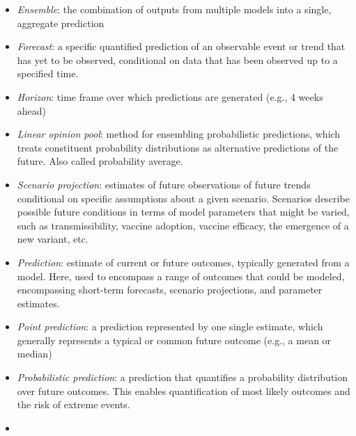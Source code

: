 \documentclass[
]{article}
\begin{document}
\begin{tcolorbox}[enhanced jigsaw, title=\textcolor{quarto-callout-tip-color}{\faLightbulb}\hspace{0.5em}{Keywords and definitions: Concepts in statistical forecasting}, coltitle=black, leftrule=.75mm, colframe=quarto-callout-tip-color-frame, left=2mm, colback=white, bottomrule=.15mm, colbacktitle=quarto-callout-tip-color!10!white, toptitle=1mm, breakable, opacityback=0, rightrule=.15mm, arc=.35mm, toprule=.15mm, bottomtitle=1mm, titlerule=0mm, opacitybacktitle=0.6]

\begin{itemize}
\item
  \emph{Ensemble}: the combination of outputs from multiple models into
  a single, aggregate prediction
\item
  \emph{Forecast}: a specific quantified prediction of an observable
  event or trend that has yet to be observed, conditional on data that
  has been observed up to a specified time.
\item
  \emph{Horizon}: time frame over which predictions are generated (e.g.,
  4 weeks ahead)
\item
  \emph{Linear opinion pool}: method for ensembling probabilistic
  predictions, which treats constituent probability distributions as
  alternative predictions of the future. Also called probability
  average.
\item
  \emph{Scenario projection}: estimates of future observations of future
  trends conditional on specific assumptions about a given scenario.
  Scenarios describe possible future conditions in terms of model
  parameters that might be varied, such as transmissibility, vaccine
  adoption, vaccine efficacy, the emergence of a new variant, etc.
\item
  \emph{Prediction}: estimate of current or future outcomes, typically
  generated from a model. Here, used to encompass a range of outcomes
  that could be modeled, encompassing short-term forecasts, scenario
  projections, and parameter estimates.
\item
  \emph{Point prediction}: a prediction represented by one single
  estimate, which generally represents a typical or common future
  outcome (e.g., a mean or median)
\item
  \emph{Probabilistic prediction}: a prediction that quantifies a
  probability distribution over future outcomes. This enables
  quantification of most likely outcomes and the risk of extreme events.
\item

\end{itemize}
\end{tcolorbox}
\end{document}
